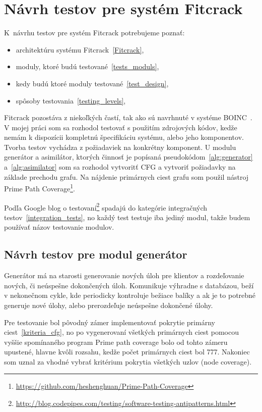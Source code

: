 \chapter{Návrh testov pre systém Fitcrack}
K~návrhu testov pre systém Fitcrack potrebujeme poznať:
\begin{itemize}
	\item architektúru systému Fitcrack~\ref{Fitcrack},
	\item moduly, ktoré budú testované~\ref{tests_moduls},
	\item kedy budú ktoré moduly testované~\ref{test_design},
	\item spôsoby testovania~\ref{testing_levels},
\end{itemize}
Fitcrack pozostáva z niekoľkých častí, tak ako sú navrhnuté v systéme BOINC~\cite{boincintro}.
V mojej práci som sa rozhodol testovať s použitím zdrojových kódov, kedže nemám k dispozícii kompletnú špecifikáciu systému, alebo jeho komponentov. 
Tvorba testov vychádza z požiadaviek na konkrétny komponent.
U modulu generátor a asimilátor, ktorých činnosť je popísaná pseudokódom~\ref{alg:generator} a~\ref{alg:asimilator} som sa rozhodol vytvoritť CFG a vytvoriť požiadavky na základe prechodu grafu. 
Na nájdenie primárnych ciest grafu som použil nástroj Prime Path Coverage\footnote{\url{https://github.com/heshenghuan/Prime-Path-Coverage}}.

Podľa Google blog o testovaní\footnote{\url{http://blog.codepipes.com/testing/software-testing-antipatterns.html}} spadajú do kategórie integračných testov~\ref{integration_tests}, no každý test testuje iba jediný modul, takže budem používať názov testovanie modulov.

\section{Návrh testov pre modul generátor}
Generátor má na starosti generovanie nových úloh pre klientov a rozdeľovanie nových, či neúspešne dokončených úloh. 
Komunikuje výhradne s databázou, beží v nekonečnom cykle, kde periodicky kontroluje bežiace balíky a ak je to potrebné generuje nové úlohy, alebo prerozdeľuje neúspešne dokončené úlohy.

Pre testovanie bol pôvodný zámer implementovať pokrytie primárny ciest~\ref{kriteria_cfg}, no po vygenerovaní všetkých primárnych ciest pomocou vyššie spomínaného program Prime path coverage bolo od tohto zámeru upustené, hlavne kvôli rozsahu, kedže počet primárnych ciest bol 777.
Nakoniec som uznal za vhodné vybrať kritérium pokrytia všetkých uzlov (node coverage).


